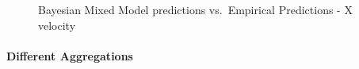 \documentclass[
  letterpaper,
  DIV=11,
  numbers=noendperiod]{scrartcl}
\let\oldparagraph\paragraph
\renewcommand{\paragraph}[1]{\oldparagraph{#1}\mbox{}}
\begin{document}
\begin{figure}[H]


\caption{\label{fig-empVsPred}Bayesian Mixed Model predictions
vs.~Empirical Predictions - X velocity}

\end{figure}%

\paragraph{Different Aggregations}\label{different-aggregations}
\end{document}
